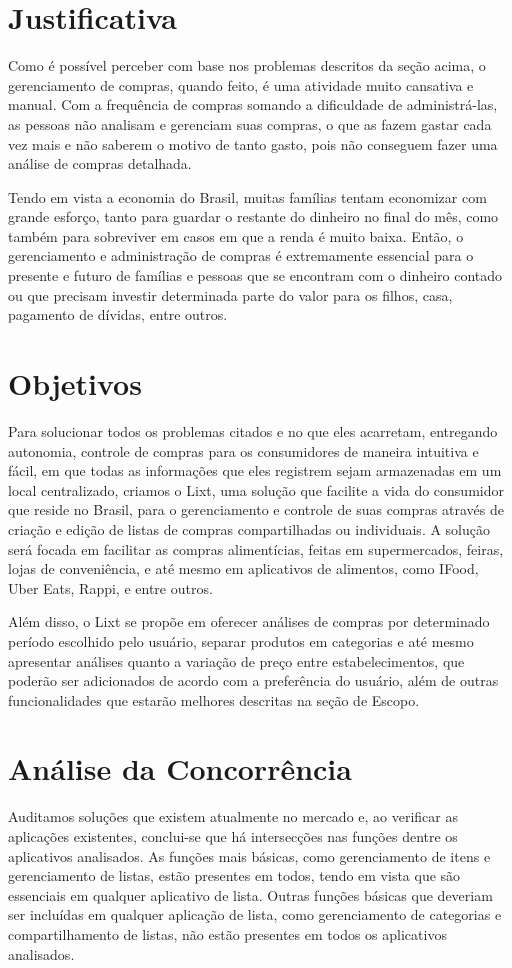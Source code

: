 \label{sec:justificativa}
\section{Justificativa}
Como é possível perceber com base nos problemas descritos da seção acima, o gerenciamento de compras, quando feito, é uma atividade muito cansativa e manual. Com a frequência de compras somando a dificuldade de administrá-las, as pessoas não analisam e gerenciam suas compras, o que as fazem gastar cada vez mais e não saberem o motivo de tanto gasto, pois não conseguem fazer uma análise de compras detalhada.

Tendo em vista a economia do Brasil, muitas famílias tentam economizar com grande esforço, tanto para guardar o restante do dinheiro no final do mês, como também para sobreviver em casos em que a renda é muito baixa. Então, o gerenciamento e administração de compras é extremamente essencial para o presente e futuro de famílias e pessoas que se encontram com o dinheiro contado ou que precisam investir determinada parte do valor para os filhos, casa, pagamento de dívidas, entre outros.

\label{sec:objetivos}
\section{Objetivos}
Para solucionar todos os problemas citados e no que eles acarretam, entregando autonomia, controle de compras para os consumidores de maneira intuitiva e fácil, em que todas as informações que eles registrem sejam armazenadas em um local centralizado, criamos o Lixt, uma solução que facilite a vida do consumidor que reside no Brasil, para o gerenciamento e controle de suas compras através de criação e edição de listas de compras compartilhadas ou individuais. A solução será focada em facilitar as compras alimentícias, feitas em supermercados, feiras, lojas de conveniência, e até mesmo em aplicativos de alimentos, como IFood, Uber Eats, Rappi, e entre outros.

Além disso, o Lixt se propõe em oferecer análises de compras por determinado período escolhido pelo usuário, separar produtos em categorias e até mesmo apresentar análises quanto a variação de preço entre estabelecimentos, que poderão ser adicionados de acordo com a preferência do usuário, além de outras funcionalidades que estarão melhores descritas na seção de Escopo.

\label{sec:analiseconcorrencia}
\section{Análise da Concorrência}
Auditamos soluções que existem atualmente no mercado e, ao verificar as aplicações existentes, conclui-se que há intersecções nas funções dentre os aplicativos analisados. As funções mais básicas, como gerenciamento de itens e gerenciamento de listas, estão presentes em todos, tendo em vista que são essenciais em qualquer aplicativo de
lista. Outras funções básicas que deveriam ser incluídas em qualquer aplicação de lista, como gerenciamento de categorias e
compartilhamento de listas, não estão presentes em todos os
aplicativos analisados.


